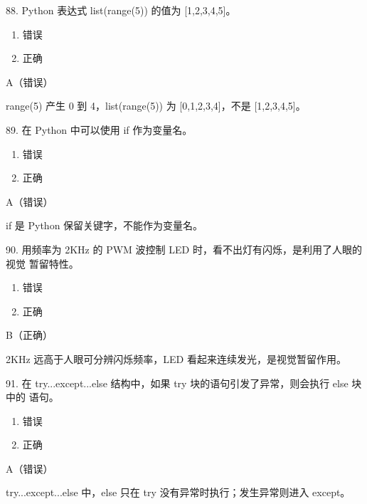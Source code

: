 \begin{question}{88. Python 表达式 list(range(5)) 的值为 [1,2,3,4,5]。}
\begin{enumerate}[label=\Alph*., leftmargin=2.4em, itemsep=0.2em]
\item 错误
\item 正确
\end{enumerate}
\end{question}
\begin{answer}
A（错误）
\end{answer}
\begin{explanation}
range(5) 产生 0 到 4，list(range(5)) 为 [0,1,2,3,4]，不是 [1,2,3,4,5]。
\end{explanation}

\begin{question}{89. 在 Python 中可以使用 if 作为变量名。}
\begin{enumerate}[label=\Alph*., leftmargin=2.4em, itemsep=0.2em]
\item 错误
\item 正确
\end{enumerate}
\end{question}
\begin{answer}
A（错误）
\end{answer}
\begin{explanation}
if 是 Python 保留关键字，不能作为变量名。
\end{explanation}

\begin{question}{90. 用频率为 2KHz 的 PWM 波控制 LED 时，看不出灯有闪烁，是利用了人眼的视觉 暂留特性。}
\begin{enumerate}[label=\Alph*., leftmargin=2.4em, itemsep=0.2em]
\item 错误
\item 正确
\end{enumerate}
\end{question}
\begin{answer}
B（正确）
\end{answer}
\begin{explanation}
2KHz 远高于人眼可分辨闪烁频率，LED 看起来连续发光，是视觉暂留作用。
\end{explanation}

\begin{question}{91. 在 try...except...else 结构中，如果 try 块的语句引发了异常，则会执行 else 块中的 语句。}
\begin{enumerate}[label=\Alph*., leftmargin=2.4em, itemsep=0.2em]
\item 错误
\item 正确
\end{enumerate}
\end{question}
\begin{answer}
A（错误）
\end{answer}
\begin{explanation}
try...except...else 中，else 只在 try 没有异常时执行；发生异常则进入 except。
\end{explanation}


